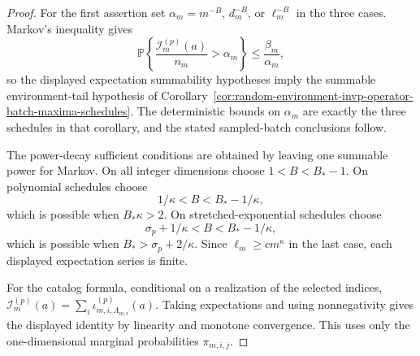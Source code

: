 \documentclass[11pt]{amsart}
\numberwithin{equation}{section}
\theoremstyle{definition}
\theoremstyle{remark}
\newcommand{\Prob}{\mathbb P}
\begin{document}
\begin{proof}
For the first assertion set \(\alpha_m=m^{-B}\), \(d_m^{-B}\), or
\(\ell_m^{-B}\) in the three cases.  Markov's inequality gives
\[
  \Prob\left\{
    \frac{\mathcal I_m^{(p)}(a)}{n_m}>\alpha_m
  \right\}
  \le \frac{\beta_m}{\alpha_m},
\]
so the displayed expectation summability hypotheses imply the summable
environment-tail hypothesis of
Corollary~\ref{cor:random-environment-invp-operator-batch-maxima-schedules}.
The deterministic bounds on \(\alpha_m\) are exactly the three schedules in
that corollary, and the stated sampled-batch conclusions follow.

The power-decay sufficient conditions are obtained by leaving one summable
power for Markov.  On all integer dimensions choose
\(1<B<B_*-1\).  On polynomial schedules choose
\[
  1/\kappa<B<B_*-1/\kappa,
\]
which is possible when \(B_*\kappa>2\).  On stretched-exponential schedules
choose
\[
  \sigma_p+1/\kappa<B<B_*-1/\kappa,
\]
which is possible when \(B_*>\sigma_p+2/\kappa\).  Since
\(\ell_m\ge c m^\kappa\) in the last case, each displayed expectation series is
finite.

For the catalog formula, conditional on a realization of the selected indices,
\(\mathcal I_m^{(p)}(a)=\sum_i\iota_{m,i,\Lambda_{m,i}}^{(p)}(a)\).  Taking
expectations and using nonnegativity gives the displayed identity by linearity
and monotone convergence.  This uses only the one-dimensional marginal
probabilities \(\pi_{m,i,j}\).
\end{proof}
\end{document}
